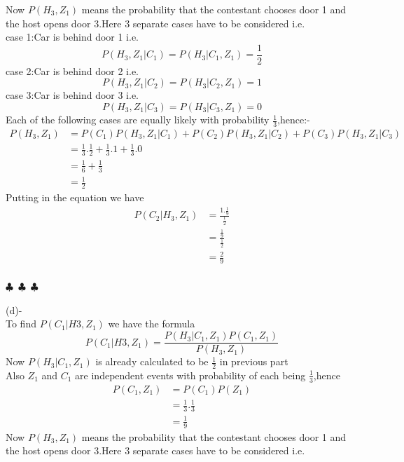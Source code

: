 \documentclass[a4paper]{article}
\begin{document}
Now $P(H_3,Z_1)$ means the probability that the contestant chooses door 1 and the host opens door 3.Here 3 separate cases have to be considered i.e.\\
\indent case 1:Car is behind door 1 i.e.\\
$$P(H_3,Z_1|C_1)=P(H_3|C_1,Z_1)=\frac{1}{2}$$
\indent case 2:Car is behind door 2 i.e.\\
$$P(H_3,Z_1|C_2)=P(H_3|C_2,Z_1)=1$$
\indent case 3:Car is behind door 3 i.e.\\
$$P(H_3,Z_1|C_3)=P(H_3|C_3,Z_1)=0$$
Each of the following cases are equally likely with probability $\frac{1}{3}$,hence:-\\
\begin{equation*}
\begin{split}
P(H_3,Z_1)&=P(C_1)P(H_3,Z_1|C_1)+P(C_2)P(H_3,Z_1|C_2)+P(C_3)P(H_3,Z_1|C_3)\\
&=\frac{1}{3}.\frac{1}{2}+\frac{1}{3}.1+\frac{1}{3}.0\\
&=\frac{1}{6}+\frac{1}{3}\\
&=\frac{1}{2}
\end{split}
\end{equation*}
Putting in the equation we have
\begin{equation*}
\begin{split}
P(C_2|H_3,Z_1)&=\frac{1.\frac{1}{9}}{\frac{1}{2}}\\
&=\frac{\frac{1}{9}}{\frac{1}{2}}\\
&=\frac{2}{9}\\
\end{split}
\end{equation*}
\begin{center}
  $\clubsuit$~$\clubsuit$~$\clubsuit$
\end{center}
(d)-\\
\indent To find $P(C_1|H3,Z_1)$ we have the formula
$$P(C_1|H3,Z_1)=\frac{P(H_3|C_1,Z_1)P(C_1,Z_1)}{P(H_3,Z_1)}$$
Now $P(H_3|C_1,Z_1)$ is already calculated to be $\frac{1}{2}$ in previous part\\
Also $Z_1$ and $C_1$ are independent events with probability of each being $\frac{1}{3}$,hence
\begin{equation*}
\begin{split}
P(C_1,Z_1)&=P(C_1)P(Z_1)\\
&=\frac{1}{3}.\frac{1}{3}\\
&=\frac{1}{9}
\end{split}
\end{equation*}
Now $P(H_3,Z_1)$ means the probability that the contestant chooses door 1 and the host opens door 3.Here 3 separate cases have to be considered i.e.\\
\end{document}

